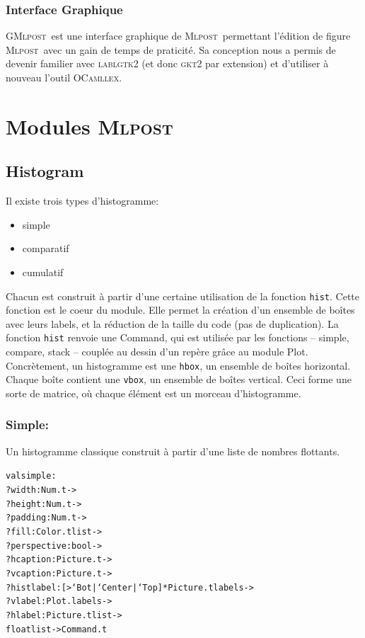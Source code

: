 \documentclass[a4paper,12pt]{article}
\newcommand{\mlpost}{\textsc{Mlpost}}
\newcommand{\gmlpost}{\textsc{GMlpost}}
\begin{document}
\subsubsection{Interface Graphique}
\gmlpost\ est une interface graphique de \mlpost\ permettant l'édition de figure \mlpost\ avec un gain de temps de praticité. Sa conception nous a permis de devenir familier avec \textsc{lablgtk2} (et donc \textsc{gkt2} par extension) et d'utiliser à nouveau l'outil \textsc{OCamllex}.

\section{Modules \mlpost}

\subsection{Histogram}
Il existe trois types d'histogramme:
\begin{itemize}
\item simple
\item comparatif
\item cumulatif
\end{itemize}
\bigskip 

Chacun est construit à partir d'une certaine utilisation de la fonction \texttt{hist}. Cette fonction est le coeur du module. Elle permet la création d'un ensemble de boîtes avec leurs labels, et la réduction de la taille du code (pas de duplication). La fonction \texttt{hist} renvoie une Command, qui est utilisée par les fonctions -- simple, compare, stack -- couplée au dessin d'un repère grâce au module Plot.
Concrètement, un histogramme est une \texttt{hbox}, un ensemble de boîtes horizontal. Chaque boîte contient une \texttt{vbox}, un ensemble de boîtes vertical. Ceci forme une sorte de matrice, où chaque élément est un morceau d'histogramme.

\subsubsection{Simple:}
Un histogramme classique construit à partir d'une liste de nombres
flottants.
\begin{alltt}
  val simple :
  ?width:Num.t ->
  ?height:Num.t ->
  ?padding:Num.t ->
  ?fill:Color.t list ->
  ?perspective: bool ->
  ?hcaption:Picture.t ->
  ?vcaption:Picture.t ->
  ?histlabel:[> `Bot | `Center | `Top ] * Picture.t labels ->
  ?vlabel:Plot.labels ->
  ?hlabel:Picture.t list -> 
  float list -> Command.t
\end{alltt}
\end{document}
